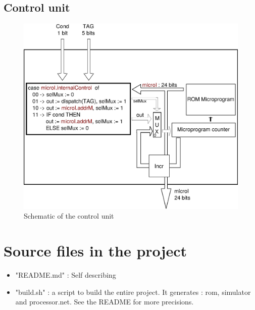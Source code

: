 \documentclass[a4paper, 11pt]{article}
\begin{document}
\subsection{Control unit}
\begin{figure}[h]
\center
\caption{Schematic of the control unit}
   \includegraphics[scale=0.5]{control.eps}
\end{figure}


\section{Source files in the project}
\begin{itemize}
\item "README.md" : Self describing
\item "build.sh" : a script to build the entire project. It generates : rom,
simulator and processor.net. See the README for more precisions.
\end{itemize}
\end{document}
